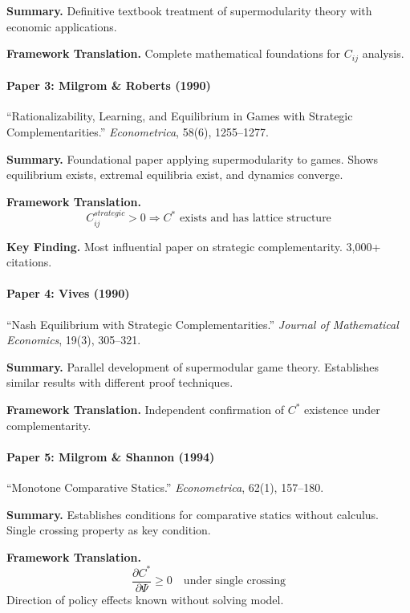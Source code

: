 \textbf{Summary.}
Definitive textbook treatment of supermodularity theory with economic applications.

\textbf{Framework Translation.}
Complete mathematical foundations for $C_{ij}$ analysis.

\paragraph{Paper 3: Milgrom \& Roberts (1990)}

``Rationalizability, Learning, and Equilibrium in Games with Strategic Complementarities.''
\textit{Econometrica}, 58(6), 1255--1277.

\textbf{Summary.}
Foundational paper applying supermodularity to games. Shows equilibrium exists, 
extremal equilibria exist, and dynamics converge.

\textbf{Framework Translation.}
\begin{equation}
C_{ij}^{strategic} > 0 \Rightarrow C^* \text{ exists and has lattice structure}
\end{equation}

\textbf{Key Finding.}
Most influential paper on strategic complementarity. 3,000+ citations.

\paragraph{Paper 4: Vives (1990)}

``Nash Equilibrium with Strategic Complementarities.''
\textit{Journal of Mathematical Economics}, 19(3), 305--321.

\textbf{Summary.}
Parallel development of supermodular game theory. Establishes similar results 
with different proof techniques.

\textbf{Framework Translation.}
Independent confirmation of $C^*$ existence under complementarity.

\paragraph{Paper 5: Milgrom \& Shannon (1994)}

``Monotone Comparative Statics.''
\textit{Econometrica}, 62(1), 157--180.

\textbf{Summary.}
Establishes conditions for comparative statics without calculus. 
Single crossing property as key condition.

\textbf{Framework Translation.}
\begin{equation}
\frac{\partial C^*}{\partial \Psi} \geq 0 \quad \text{under single crossing}
\end{equation}
Direction of policy effects known without solving model.


